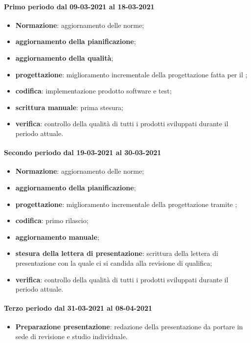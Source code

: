 \paragraph{Primo periodo dal 09-03-2021 al 18-03-2021} 
\begin{itemize} 
	\item \textbf{Normazione}: aggiornamento delle norme; 
	\item \textbf{aggiornamento della pianificazione}; 
	\item \textbf{aggiornamento della qualità}; 
	\item \textbf{progettazione}: miglioramento incrementale della progettazione fatta per il ; 
	\item \textbf{codifica}: implementazione prodotto software e test; 
	\item \textbf{scrittura manuale}: prima stesura; 
	\item \textbf{verifica}: controllo della qualità di tutti i prodotti sviluppati durante il periodo attuale. 
\end{itemize} 

\paragraph{Secondo periodo dal 19-03-2021 al 30-03-2021} 
\begin{itemize} 
	\item \textbf{Normazione}: aggiornamento delle norme; 
	\item \textbf{aggiornamento della pianificazione}; 
	\item \textbf{progettazione}: miglioramento incrementale della progettazione tramite ; 
	\item \textbf{codifica}: primo rilascio; 
	\item \textbf{aggiornamento manuale}; 
	\item \textbf{stesura della lettera di presentazione}: scrittura della lettera di presentazione con la quale ci 
	si candida alla revisione di qualifica; 
	\item \textbf{verifica}: controllo della qualità di tutti i prodotti sviluppati durante il periodo attuale. 
\end{itemize} 

\paragraph{Terzo periodo dal 31-03-2021 al 08-04-2021} 
\begin{itemize} 
	\item \textbf{Preparazione presentazione}: redazione della presentazione da portare in sede di revisione e 
	studio individuale. 
\end{itemize} 

